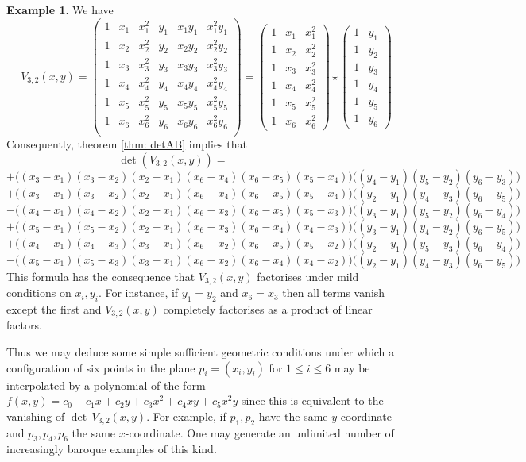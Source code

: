 \documentclass[10pt]{amsart}
\theoremstyle{definition}
\newtheorem{example}[thm]{Example}
\theoremstyle{remark}
\numberwithin{equation}{section}
\newcommand{\0}{\color{blue}{\mathsf{0}}}
\begin{document}
\begin{example} \label{example:V32}
We have
\[ V_{3,2}(x,y) =  \begin{pmatrix} 1 & x_1 & x_1^2 &  y_1 & x_1y_1 & x^2_1y_1 \nonumber\\ 
1 & x_2 & x_2^2 &y_2 & x_2y_2& x^2_2y_2 \nonumber\\ 
1 & x_3 & x_3^2& y_3 & x_3y_3& x^2_3y_3 \nonumber\\ 
1 & x_4 & x_4^2 & y_4 & x_4y_4& x^2_4y_4 \nonumber\\ 
1 & x_5 & x_5^2 & y_5 & x_5y_5& x^2_5y_5 \nonumber\\ 
1 & x_6 & x_6^2 & y_6 & x_6y_6& x^2_6y_6 \nonumber\\ 
\end{pmatrix} = \begin{pmatrix} 1 & x_1 & x_1^2  \\
 1& x_2& x_2^2 \\
  1& x_3 & x_3^2 \\ 
  1& x_4 & x_4^2  \\ 
   1& x_5 & x_5^2  \\ 
    1& x_6 & x_6^2  
  \end{pmatrix} \star \begin{pmatrix} 1 & y_1 \\ 1& y_2 \\ 1& y_3 \\ 1& y_4 \\ 1& y_5 \\ 1& y_6 \end{pmatrix}   \]
Consequently, theorem \ref{thm: detAB} implies that 
\[ \det(V_{3,2}(x,y))  = \qquad \qquad \qquad \]
\[ + \Big((x_3-x_1)(x_3-x_2)(x_2-x_1)(x_6-x_4)(x_6-x_5)(x_5-x_4) \Big)\Big((y_4-y_1)(y_5-y_2)(y_6-y_3)\Big)\]
\[ + \Big((x_3-x_1)(x_3-x_2)(x_2-x_1)(x_6-x_4)(x_6-x_5)(x_5-x_4) \Big)\Big((y_2-y_1)(y_4-y_3)(y_6-y_5)\Big)\]
\[ - \Big((x_4-x_1)(x_4-x_2)(x_2-x_1)(x_6-x_3)(x_6-x_5)(x_5-x_3) \Big)\Big((y_3-y_1)(y_5-y_2)(y_6-y_4)\Big)\]
\[ + \Big((x_5-x_1)(x_5-x_2)(x_2-x_1)(x_6-x_3)(x_6-x_4)(x_4-x_3) \Big)\Big((y_3-y_1)(y_4-y_2)(y_6-y_5)\Big)\]
\[ + \Big((x_4-x_1)(x_4-x_3)(x_3-x_1)(x_6-x_2)(x_6-x_5)(x_5-x_2) \Big)\Big((y_2-y_1)(y_5-y_3)(y_6-y_4)\Big)\]
\[ - \Big((x_5-x_1)(x_5-x_3)(x_3-x_1)(x_6-x_2)(x_6-x_4)(x_4-x_2) \Big)\Big((y_2-y_1)(y_4-y_3)(y_6-y_5)\Big)\]
This formula has the consequence that $V_{3,2}(x,y)$ factorises under  mild conditions on $x_i,y_i$. For instance, if $y_1=y_2$ and $x_6=x_3$ then all terms vanish except the first and $V_{3,2}(x,y)$ completely factorises as a product of linear factors.

Thus we may deduce some simple sufficient geometric conditions under which a configuration of six points in the plane $p_i=(x_i,y_i)$ for $1\leq i \leq 6$ may be interpolated by a polynomial of the form $f(x,y) = c_0 + c_1 x + c_2 y + c_3 x^2 + c_4 xy + c_5 x^2 y$ since this is equivalent to the vanishing of $\det\, V_{3,2}(x,y)$.  For example, if  $p_1,p_2$ have the same $y$ coordinate and $p_3,p_4, p_6$ the same $x$-coordinate. One may generate an unlimited number of increasingly baroque examples of this kind. 
\end{example} 
\end{document}
